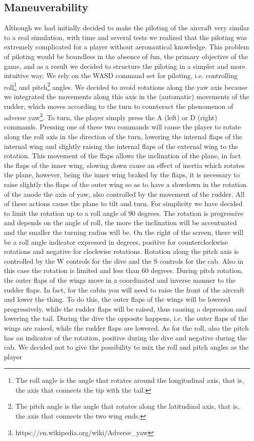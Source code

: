 \documentclass{article}
\begin{document}
\subsection*{Maneuverability}
Although we had initially decided to make the piloting of the aircraft very similar to a real simulation, with time and several tests we realized that the piloting was extremely complicated for a player without aeronautical knowledge. This problem of piloting would be boundless in the absence of fun, the primary objective of the game, and as a result we decided to structure the piloting in a simpler and more intuitive way. We rely on the WASD command set for piloting, i.e. controlling roll\footnote{The roll angle is the angle that rotates around the longitudinal axis, that is, the axis that connects the tip with the tail.} and pitch\footnote{The pitch angle is the angle that rotates along the latitudinal axis, that is, the axis that connects the two wing ends.} angles. We decided to avoid rotations along the yaw axis because we integrated the movements along this axis in the (automatic) movements of the rudder, which moves according to the turn to counteract the phenomenon of adverse yaw\footnote{https://en.wikipedia.org/wiki/Adverse\_yaw}. To turn, the player simply press the A (left) or D (right) commands. Pressing one of these two commands will cause the player to rotate along the roll axis in the direction of the turn, lowering the internal flaps of the internal wing and slightly raising the internal flaps of the external wing to the rotation. This movement of the flaps allows the inclination of the plane, in fact the flaps of the inner wing, slowing down cause an effect of inertia which rotates the plane, however, being the inner wing braked by the flaps, it is necessary to raise slightly the flaps of the outer wing so as to have a slowdown in the rotation of the anode the axis of yaw, also controlled by the movement of the rudder. All of these actions cause the plane to tilt and turn. For simplicity we have decided to limit the rotation up to a roll angle of 90 degrees. The rotation is progressive and depends on the angle of roll, the more the inclination will be accentuated and the smaller the turning radius will be. On the right of the screen, there will be a roll angle indicator expressed in degrees, positive for counterclockwise rotations and negative for clockwise rotations. Rotation along the pitch axis is controlled by the W controls for the dive and the S controls for the cab. Also in this case the rotation is limited and less than 60 degrees. During pitch rotation, the outer flaps of the wings move in a coordinated and inverse manner to the rudder flaps. In fact, for the cabin you will need to raise the front of the aircraft and lower the thing. To do this, the outer flaps of the wings will be lowered progressively, while the rudder flaps will be raised, thus causing a depression and lowering the tail. During the dive the opposite happens, i.e. the outer flaps of the wings are raised, while the rudder flaps are lowered. As for the roll, also the pitch has an indicator of the rotation, positive during the dive and negative during the cab. We decided not to give the possibility to mix the roll and pitch angles as the player 
\end{document}
